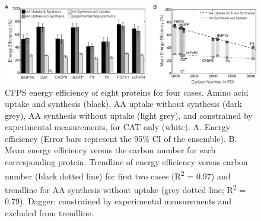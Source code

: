 \documentclass[journal=asbcd6,manuscript=article]{achemso}
\begin{document}
\begin{figure}[t!]
\centering
\includegraphics[width=1.00\textwidth]{./Figures/Energy.pdf}
\caption{CFPS energy efficiency of eight proteins for four cases. Amino acid uptake and synthesis (black), AA uptake without synthesis (dark grey), AA synthesis without uptake (light grey), and constrained by experimental measurements, for CAT only (white). A. Energy efficiency (Error bars represent the 95\% CI of the ensemble). B. Mean energy efficiency versus the carbon number for each corresponding protein. Trendline of energy efficiency versus carbon number (black dotted line) for first two cases  (R\textsuperscript{2} = 0.97) and trendline for AA synthesis without uptake (grey dotted line; R\textsuperscript{2} = 0.79). Dagger: constrained by experimental measurements and excluded from trendline.}
\label{fig:Energy}
\end{figure}
\end{document}
